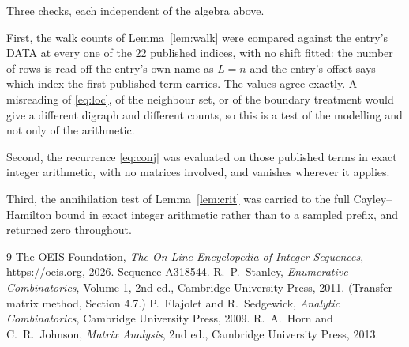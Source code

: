 \documentclass[11pt,a4paper]{article}
\theoremstyle{plain}
\theoremstyle{definition}
\begin{document}
Three checks, each independent of the algebra above.

First, the walk counts of Lemma~\ref{lem:walk} were compared against the entry's DATA at
every one of the $22$ published indices, with no shift fitted: the number of rows is
read off the entry's own name as $L=n$ and the entry's offset says which index the first
published term carries. The values agree exactly. A misreading of \eqref{eq:loc}, of the
neighbour set, or of the boundary treatment would give a different digraph and different
counts, so this is a test of the modelling and not only of the arithmetic.

Second, the recurrence \eqref{eq:conj} was evaluated on those published terms in exact
integer arithmetic, with no matrices involved, and vanishes wherever it applies.

Third, the annihilation test of Lemma~\ref{lem:crit} was carried to the full
Cayley--Hamilton bound in exact integer arithmetic rather than to a sampled prefix, and
returned zero throughout.

\begin{thebibliography}{9}
 The OEIS Foundation, \emph{The On-Line Encyclopedia of Integer
Sequences}, \url{https://oeis.org}, 2026. Sequence A318544.
 R.~P.~Stanley, \emph{Enumerative Combinatorics}, Volume 1, 2nd ed.,
Cambridge University Press, 2011. (Transfer-matrix method, Section 4.7.)
 P.~Flajolet and R.~Sedgewick, \emph{Analytic Combinatorics}, Cambridge
University Press, 2009.
 R.~A.~Horn and C.~R.~Johnson, \emph{Matrix Analysis}, 2nd ed., Cambridge
University Press, 2013.
\end{thebibliography}
\end{document}

